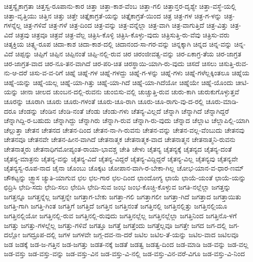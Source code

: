 {ಚಿತ್ತಸ್ಯೈಕಾಗ್ರತಾ
ಚಿತ್ತಸ್ವ-ರೂಪಾನು-ಕಾರ
ಚಿತ್ತಾ
ಚಿತ್ತಾ-ಕಾಶ-ವೆಂಬ
ಚಿತ್ತಾ-ಗಲಿ
ಚಿತ್ತಾನ್ತರ-ದೃಶ್ಯೇ
ಚಿತ್ತಾ-ವಸ್ಥೆ-ಯಲ್ಲಿ
ಚಿತ್ತಾ-ವೃತ್ತಿಯು
ಚಿತ್ತಿನ
ಚಿತ್ತು
ಚಿತ್ತೇ
ಚಿತ್ತೈಕಾಗ್ರತೆ-ಯನ್ನು
ಚಿತ್ತೈಕಾಗ್ರತೆ-ಯಿಂದ
ಚಿತ್ರ
ಚಿತ್ರ-ಗಳ
ಚಿತ್ರ-ಗ-ಳನ್ನು
ಚಿತ್ರ-ಗಳನ್ನೆಲ್ಲ
ಚಿತ್ರ-ಗಳಿವೆ
ಚಿತ್ರ-ಗಳೆ
ಚಿತ್ರ-ದಿಂದ
ಚಿತ್ರ-ವನ್ನು
ಚಿತ್ರ-ವನ್ನೆಲ್ಲಾ
ಚಿತ್ರ-ವಾಗಿ
ಚಿತ್ರ-ವಾಗುತ್ತಿದೆ
ಚಿತ್ರ-ವಿತ್ತು
ಚಿತ್ರ-ವಿದೆ
ಚಿತ್ರವು
ಚಿತ್ರವೂ
ಚಿತ್ರವೆ
ಚಿತ್ರ-ವೆಲ್ಲ
ಚಿತ್ರಿಸಿ-ಕೊಳ್ಳಿ
ಚಿತ್ರಿಸಿ-ಕೊಳ್ಳು-ವುದು
ಚಿತ್ರಿಸುತ್ತಿ-ರು-ವೆವು
ಚಿತ್ರಿಸು-ವರು
ಚಿತ್ಶಕ್ತಿಯ
ಚಿತ್ಸ್ವ-ರೂಪ
ಚಿದಾ-ಕಾಶ
ಚಿದಾ-ಕಾಶ-ದಲ್ಲಿ
ಚಿದಾನಂದ-ಸಾ-ಗರ-ವನ್ನು
ಚಿನ್ನಕ್ಕಾಗಿ
ಚಿನ್ನದ
ಚಿನ್ನ-ವನ್ನು
ಚಿನ್ನ-ವಿದೆ
ಚಿಪ್ಪನ್ನು
ಚಿಪ್ಪಿಗೆ
ಚಿಪ್ಪಿನ
ಚಿಪ್ಪಿನಂತೆ
ಚಿಪ್ಪಿ-ನಲ್ಲಿ-ರುವ
ಚಿರ
ಚಿರಂಜೀವತ್ವ-ವನ್ನು
ಚಿರ-ಏಕಾಗ್ರ-ತೆಯ
ಚಿರ-ಜಾಗ್ರತ
ಚಿರ-ಜಾಗ್ರತ-ವಾದ
ಚಿರ-ನೂ-ತನ-ವಾಗಿದೆ
ಚಿರ-ಪರಿ-ಚಿತ
ಚಿರಸ್ಥಾಯಿ-ಯಾಗಿ-ರು-ವುದು
ಚಿಸದೆ
ಚಿಸಲು
ಚಿಸುತ್ತಿ-ರುವ-ನು-ಆ-ದರೆ
ಚಿಸು-ವ-ವ-ರಿಗೆ
ಚಿಹ್ನೆ
ಚಿಹ್ನೆ-ಗಳ
ಚಿಹ್ನೆ-ಗಳದ್ದು
ಚಿಹ್ನೆ-ಗ-ಳನ್ನು
ಚಿಹ್ನೆ-ಗಳು
ಚಿಹ್ನೆ-ಗಳೆಲ್ಲಕ್ಕಿಂತಲೂ
ಚಿಹ್ನೆಯ
ಚಿಹ್ನೆ-ಯನ್ನು
ಚಿಹ್ನೆ-ಯಲ್ಲ
ಚಿಹ್ನೆ-ಯಾ-ಗಿತ್ತು
ಚಿಹ್ನೆ-ಯಾ-ಗಿದೆ
ಚಿಹ್ನೆ-ಯಾ-ಗಿದೆಯೋ
ಚಿಹ್ನೆಯೇ
ಚಿಹ್ನೆ-ಯೊಂದು
ಚೀಟಿ-ಯನ್ನು
ಚೀನಾ
ಚೀಲದ
ಚುಂಬನ-ದಲ್ಲಿ-ರುವನು
ಚುಂಬಿಸು-ವಲ್ಲಿ
ಚುಚ್ಚುತ್ತಿ-ರುವ
ಚುರು-ಕಾಗಿ
ಚುರುಕುಗೊಳ್ಳುತ್ತವೆ
ಚೂರನ್ನು
ಚೂರಾಗಿ
ಚೂರು
ಚೂರು-ಗಳಂತೆ
ಚೂರು-ಚೂ-ರಾಗಿ
ಚೂರು-ಚೂ-ರಾಗು-ವು-ದ-ರಲ್ಲಿ
ಚೂರು-ಮಾಡಿ-ದರೂ
ಚೆಂಡನ್ನು
ಚೆಂಡಿನ
ಚೆಂಡಿ-ನಂತೆ
ಚೆಂಡು
ಚೆಂಡು-ಗಳು
ಚೆತನ್ಯ-ವಿಲ್ಲದೆ
ಚೆನ್ನಾಗಿ
ಚೆನ್ನಾಗಿದೆ
ಚೆನ್ನಾಗಿದ್ದರೆ
ಚೆನ್ನಾಗಿದ್ದಿ-ರ-ಬಹುದು
ಚೆನ್ನಾಗಿದ್ದು
ಚೆನ್ನಾಗಿರು
ಚೆನ್ನಾಗಿ-ರುವ
ಚೆನ್ನಾಗಿ-ರು-ವುದು
ಚೆನ್ನಾದ
ಚೆಲ್ಲಾಟ
ಚೆಲ್ಲಾಪಿಲ್ಲಿ-ಯಾಗಿ
ಚೆಲ್ಲುತ್ತಾ
ಚೇತನ
ಚೇತನದ
ಚೇತನ-ದಿಂದ
ಚೇತನ-ನಾ-ಗಿ-ರುವನು
ಚೇತನ-ವನ್ನು
ಚೇತನ-ವಲ್ಲ-ವೆಂಬುದು
ಚೇತನವು
ಚೇತನವೂ
ಚೇತನವೇ
ಚೇತನ-ಹೀನ-ವಾಗಿದೆ
ಚೇತನಾತ್ಮಕ
ಚೇತನಾತ್ಮಕ-ವಾದ
ಚೇತನಾತ್ಮನ
ಚೇತನಾತ್ಮನಿ-ರುವನು
ಚೇತನಾತ್ಮರು
ಚೇತನಾಧಿಗಮೋಪ್ಯಂತ-ರಾಯಾ-ಭಾವಶ್ಚ
ಚೇತಿ
ಚೇಳು
ಚೈತನ್ಯ
ಚೈತನ್ಯಕ್ಕೆ
ಚೈತನ್ಯದ
ಚೈತನ್ಯ-ದಂತೆ
ಚೈತನ್ಯ-ಮಾತ್ರನು
ಚೈತನ್ಯ-ವನ್ನು
ಚೈತನ್ಯ-ವಿದೆ
ಚೈತನ್ಯ-ವಿದ್ದರೆ
ಚೈತನ್ಯ-ವಿದ್ದಿದ್ದರೆ
ಚೈತನ್ಯ-ವಿಲ್ಲ
ಚೈತನ್ಯವು
ಚೈತನ್ಯವೇ
ಚೈತನ್ಯಸ್ವ-ರೂಪ-ನಾದ
ಚೈನಾ
ಚೊಂಬು
ಚೊಕ್ಕಟ
ಚೋಪಾನ-ವಾಗಿ-ರ-ಬೇಕಾ-ಗಿಲ್ಲ
ಚೋಭ-ಯಾನ-ವ-ಧಾರ-ಣಮ್
ಚೌಕಟ್ಟನ್ನು
ಚ್ಛ್ವಾಸ
ಚ್ಯುತಿ-ಯಾಗುವ
ಛಲ
ಛಲ-ಗಾರ
ಛಲ-ದಿಂದ
ಛಾಂದೋಗ್ಯ
ಛಾಯೆ
ಛಾಯೆ-ಯಂತೆ
ಛಾಯೆ-ಯನ್ನು
ಛಿದ್ರಿಸಿ
ಛೇದಿ-ಸದು
ಛೇದಿ-ಸಲು
ಛೇದಿಸಿ
ಛೇದಿ-ಸುವ
ಜಂಭ
ಜಂಭ-ಕೊಚ್ಚಿ-ಕೊಳ್ಳುವ
ಜಗತಿ-ನಲ್ಲೆಲ್ಲಾ
ಜಗತ್ತನ್ನು
ಜಗತ್ತನ್ನೂ
ಜಗತ್ತನ್ನೆಲ್ಲ
ಜಗತ್ತನ್ನೇ
ಜಗತ್ತಾಗ-ಬೇಕು
ಜಗತ್ತಾ-ಗಲಿ
ಜಗತ್ತಾಗಲೀ
ಜಗತ್ತಾ-ಗಿದೆ
ಜಗತ್ತಾದ
ಜಗತ್ತಾಯಿತು
ಜಗತ್ತಿ-ಗಾಗಿ
ಜಗತ್ತಿ-ಗಿಂತ
ಜಗತ್ತಿಗೆ
ಜಗತ್ತಿದೆ
ಜಗತ್ತಿನ
ಜಗತ್ತಿನಂತೆ
ಜಗತ್ತಿನಲ್ಲಿ
ಜಗತ್ತಿನಲ್ಲಿತ್ತು
ಜಗತ್ತಿನಲ್ಲಿಯೂ
ಜಗತ್ತಿನಲ್ಲಿಯೋ
ಜಗತ್ತಿನಲ್ಲಿ-ರುವ
ಜಗತ್ತಿನಲ್ಲಿ-ರುವುದು
ಜಗತ್ತಿನಲ್ಲೆಲ್ಲ
ಜಗತ್ತಿನಲ್ಲೆಲ್ಲಾ
ಜಗತ್ತಿನಿಂದ
ಜಗತ್ತಿನೊ-ಳಗೆ
ಜಗತ್ತು
ಜಗತ್ತು-ಗಳಲ್ಲೆಲ್ಲ
ಜಗತ್ತು-ಗಳಿವೆ
ಜಗತ್ತೂ
ಜಗತ್ತೆ
ಜಗತ್ತೆಂದು
ಜಗತ್ತೆಲ್ಲವೂ
ಜಗತ್ತೇ
ಜಗದ
ಜಗ-ದಲ್ಲಿ
ಜಗ-ದಲ್ಲೋ
ಜಗದ್ರೂಪ-ದಲ್ಲಿ
ಜಗಳ
ಜಗಳವೇ
ಜಗ್ಗ-ದವ-ನಾ-ದರೆ
ಜಟಿಲ
ಜಟಿಲ-ತೆ-ಯನ್ನು
ಜಟಿಲ-ವಾದ
ಜಟಿಲವೂ
ಜಡ
ಜಡಕ್ಕೆ
ಜಡ-ಜ-ಗತ್ತಿನ
ಜಡ-ಜಗತ್ತು
ಜಡತ-ನಕ್ಕೆ
ಜಡತೆ
ಜಡತ್ವ
ಜಡತ್ವ-ದಿಂದ
ಜಡ-ಮಾಡಿ
ಜಡ-ವನ್ನು
ಜಡ-ವಲ್ಲ
ಜಡ-ವಸ್ತು
ಜಡ-ವಸ್ತು-ವನ್ನು
ಜಡ-ವಸ್ತು-ವಿನ
ಜಡ-ವಸ್ತು-ವಿ-ನಲ್ಲಿ
ಜಡ-ವಸ್ತು-ವಿನ-ವರೆ-ವಿಗೂ
ಜಡ-ವಸ್ತು-ವಿ-ನಿಂದ
}
